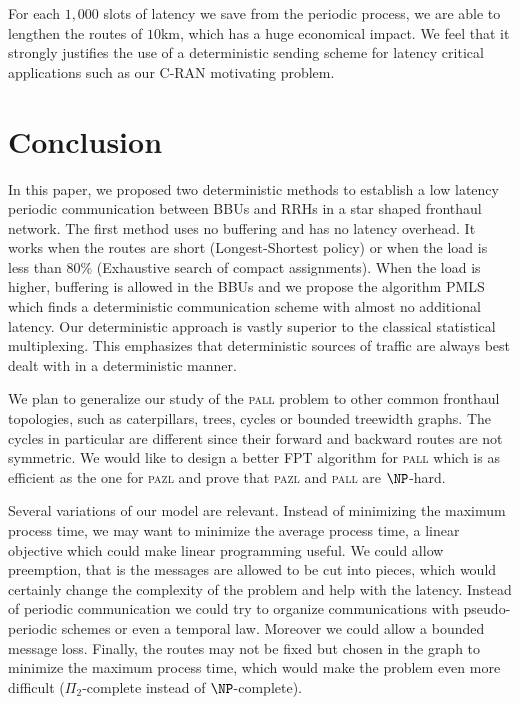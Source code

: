 \documentclass[10pt, conference, letterpaper]{IEEEtran}
\newcommand\pazl{\textsc{pazl}\xspace}
\newcommand\pall{\textsc{pall}\xspace}
\begin{document}
    For each $1,000$ slots of latency we save from the periodic process, we are able to lengthen the routes of $10$km, which has a huge economical impact. We feel that it strongly justifies the use of a deterministic sending scheme for latency critical applications such as our C-RAN motivating problem.    
     
 \section{Conclusion}
In this paper, we proposed two deterministic methods to establish a low latency periodic communication between BBUs and RRHs in a star shaped fronthaul network. The first method uses no buffering and has no latency overhead. It works when the routes are short (Longest-Shortest policy) or when the load is less than $80\%$ (Exhaustive search of compact assignments).  
When the load is higher, buffering is allowed in the BBUs and we propose the algorithm PMLS which  finds a deterministic communication scheme with almost no additional latency.
 Our deterministic approach is vastly superior to the classical statistical multiplexing. This emphasizes that deterministic sources of traffic are always best dealt with in a deterministic manner.  

   
   We plan to generalize our study of the \pall problem to other common fronthaul topologies,
   such as caterpillars, trees, cycles or bounded treewidth graphs. The cycles in particular are different since their forward and backward routes are not symmetric. 
   We would like to design a better FPT algorithm for \pall which is as efficient as the one for \pazl and prove that \pazl and \pall are $\NP$-hard.

   Several variations of our model are relevant. Instead of minimizing the maximum process time, we may want to minimize the average process time, a linear objective which could make linear programming useful. We could allow preemption, that is the messages are allowed to be cut into pieces, which would certainly change the complexity of the problem and help with the latency.  Instead of periodic communication we could try to organize communications with pseudo-periodic schemes or even a temporal law. Moreover we could allow a bounded message loss. Finally, the routes may not be fixed but chosen in the graph to minimize the maximum process time, which would make the problem even more difficult ($\Pi_2$-complete instead of $\NP$-complete). 
\end{document}
